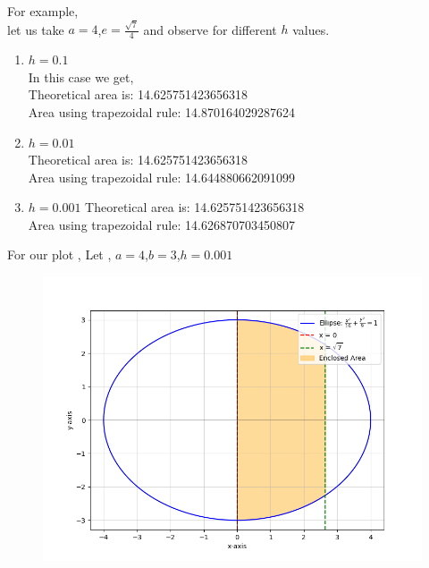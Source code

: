 \documentclass[journal]{IEEEtran}
\begin{document}
For example,\\
let us take $a = 4$,$e = \frac{\sqrt{7}}{4}$ and observe for different $h$ values.
\begin{enumerate}
    \item  $h = 0.1$\\
    In this case we get, \\
Theoretical area is:  14.625751423656318\\
Area using trapezoidal rule:  14.870164029287624\\
\item $h = 0.01$\\
Theoretical area is:  14.625751423656318\\
Area using trapezoidal rule:  14.644880662091099\\
\item $h = 0.001$
Theoretical area is:  14.625751423656318\\
Area using trapezoidal rule:  14.626870703450807\\
\end{enumerate}

For our plot , Let , $a = 4$,$b = 3$,$h = 0.001$
\begin{figure}[h!]
   \centering
   \includegraphics[width=0.75\columnwidth]{figures/Figure_1.png}
\end{figure}
\end{document}
